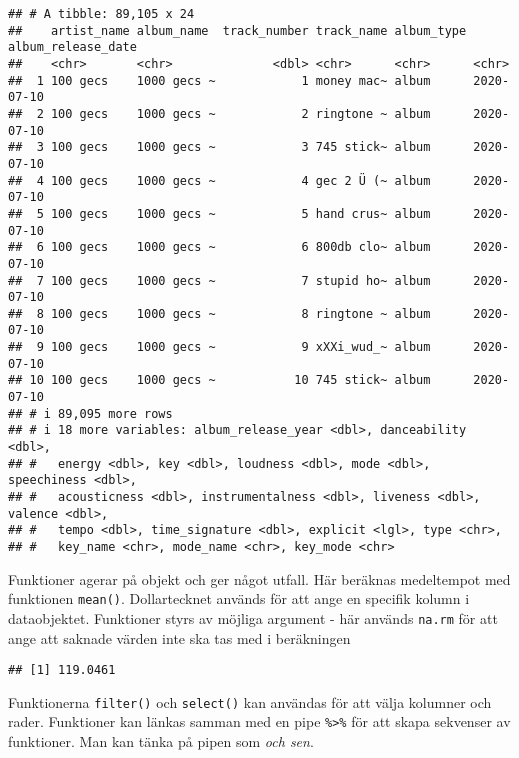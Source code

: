 \documentclass[
]{book}
\newenvironment{Shaded}{\begin{snugshade}}{\end{snugshade}}
\newcommand{\AttributeTok}[1]{\textcolor[rgb]{0.13,0.29,0.53}{#1}}
\newcommand{\CommentTok}[1]{\textcolor[rgb]{0.56,0.35,0.01}{\textit{#1}}}
\newcommand{\FunctionTok}[1]{\textcolor[rgb]{0.13,0.29,0.53}{\textbf{#1}}}
\newcommand{\NormalTok}[1]{#1}
\newcommand{\SpecialCharTok}[1]{\textcolor[rgb]{0.81,0.36,0.00}{\textbf{#1}}}
\theoremstyle{definition}
\theoremstyle{definition}
\theoremstyle{definition}
\theoremstyle{definition}
\theoremstyle{remark}
\begin{document}
\begin{verbatim}
## # A tibble: 89,105 x 24
##    artist_name album_name  track_number track_name album_type album_release_date
##    <chr>       <chr>              <dbl> <chr>      <chr>      <chr>             
##  1 100 gecs    1000 gecs ~            1 money mac~ album      2020-07-10        
##  2 100 gecs    1000 gecs ~            2 ringtone ~ album      2020-07-10        
##  3 100 gecs    1000 gecs ~            3 745 stick~ album      2020-07-10        
##  4 100 gecs    1000 gecs ~            4 gec 2 Ü (~ album      2020-07-10        
##  5 100 gecs    1000 gecs ~            5 hand crus~ album      2020-07-10        
##  6 100 gecs    1000 gecs ~            6 800db clo~ album      2020-07-10        
##  7 100 gecs    1000 gecs ~            7 stupid ho~ album      2020-07-10        
##  8 100 gecs    1000 gecs ~            8 ringtone ~ album      2020-07-10        
##  9 100 gecs    1000 gecs ~            9 xXXi_wud_~ album      2020-07-10        
## 10 100 gecs    1000 gecs ~           10 745 stick~ album      2020-07-10        
## # i 89,095 more rows
## # i 18 more variables: album_release_year <dbl>, danceability <dbl>,
## #   energy <dbl>, key <dbl>, loudness <dbl>, mode <dbl>, speechiness <dbl>,
## #   acousticness <dbl>, instrumentalness <dbl>, liveness <dbl>, valence <dbl>,
## #   tempo <dbl>, time_signature <dbl>, explicit <lgl>, type <chr>,
## #   key_name <chr>, mode_name <chr>, key_mode <chr>
\end{verbatim}

Funktioner agerar på objekt och ger något utfall. Här beräknas medeltempot med funktionen \texttt{mean()}. Dollartecknet används för att ange en specifik kolumn i dataobjektet. Funktioner styrs av möjliga argument - här används \texttt{na.rm} för att ange att saknade värden inte ska tas med i beräkningen

\begin{Shaded}
\end{Shaded}

\begin{verbatim}
## [1] 119.0461
\end{verbatim}

Funktionerna \texttt{filter()} och \texttt{select()} kan användas för att välja kolumner och rader. Funktioner kan länkas samman med en pipe \texttt{\%\textgreater{}\%} för att skapa sekvenser av funktioner. Man kan tänka på pipen som \emph{och sen}.
\end{document}
